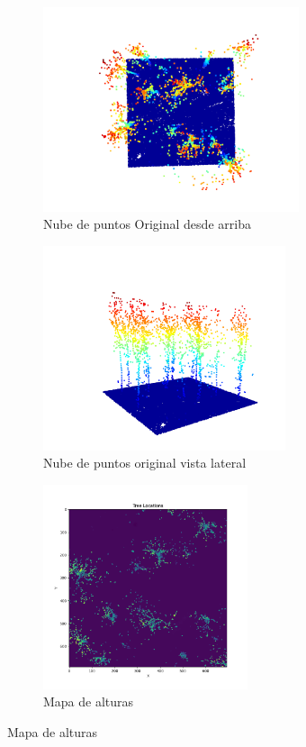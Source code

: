 \begin{figure}[h]
\centering
\begin{subfigure}[t]{.4\textwidth}
  \centering
  \includegraphics[height=6cm]{imaxes/slice_sup.png}
  \caption{Nube de puntos Original desde arriba}
  \label{fig:slice_top}
\end{subfigure}
\begin{subfigure}[t]{.4\textwidth}
  \centering
  \includegraphics[height=6cm]{imaxes/slice_lat.png}
  \caption{Nube de puntos original vista lateral}
  \label{fig:slice_lat}
\end{subfigure}
\begin{subfigure}[t]{.4\textwidth}
  \centering
  \includegraphics[height=6cm]{imaxes/chm.png}
  \caption{Mapa de alturas}
  \label{fig:chm}
\end{subfigure}%

\end{figure}
